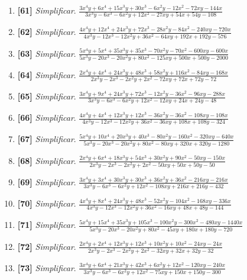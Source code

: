 \documentclass[11pt,a4paper]{article}
\newcommand{\ejercicio}[3]{\item \textbf{[#1]} \textit{#2}. $ #3 $}
\begin{document}
\begin{enumerate}
\ejercicio{61}{Simplificar}{\frac{3 x^{4} y + 6 x^{4} + 15 x^{3} y + 30 x^{3} - 6 x^{2} y - 12 x^{2} - 72 x y - 144 x}{3 x^{3} y - 6 x^{3} - 6 x^{2} y + 12 x^{2} - 27 x y + 54 x + 54 y - 108}}
\ejercicio{62}{Simplificar}{\frac{4 x^{4} y + 12 x^{4} + 24 x^{3} y + 72 x^{3} - 28 x^{2} y - 84 x^{2} - 240 x y - 720 x}{4 x^{3} y - 12 x^{3} - 12 x^{2} y + 36 x^{2} - 64 x y + 192 x + 192 y - 576}}
\ejercicio{63}{Simplificar}{\frac{5 x^{4} y + 5 x^{4} + 35 x^{3} y + 35 x^{3} - 70 x^{2} y - 70 x^{2} - 600 x y - 600 x}{5 x^{3} y - 20 x^{3} - 20 x^{2} y + 80 x^{2} - 125 x y + 500 x + 500 y - 2000}}
\ejercicio{64}{Simplificar}{\frac{2 x^{4} y + 4 x^{4} + 24 x^{3} y + 48 x^{3} + 58 x^{2} y + 116 x^{2} - 84 x y - 168 x}{2 x^{3} y - 2 x^{3} - 2 x^{2} y + 2 x^{2} - 72 x y + 72 x + 72 y - 72}}
\ejercicio{65}{Simplificar}{\frac{3 x^{4} y + 9 x^{4} + 24 x^{3} y + 72 x^{3} - 12 x^{2} y - 36 x^{2} - 96 x y - 288 x}{3 x^{3} y - 6 x^{3} - 6 x^{2} y + 12 x^{2} - 12 x y + 24 x + 24 y - 48}}
\ejercicio{66}{Simplificar}{\frac{4 x^{4} y + 4 x^{4} + 12 x^{3} y + 12 x^{3} - 36 x^{2} y - 36 x^{2} - 108 x y - 108 x}{4 x^{3} y - 12 x^{3} - 12 x^{2} y + 36 x^{2} - 36 x y + 108 x + 108 y - 324}}
\ejercicio{67}{Simplificar}{\frac{5 x^{4} y + 10 x^{4} + 20 x^{3} y + 40 x^{3} - 80 x^{2} y - 160 x^{2} - 320 x y - 640 x}{5 x^{3} y - 20 x^{3} - 20 x^{2} y + 80 x^{2} - 80 x y + 320 x + 320 y - 1280}}
\ejercicio{68}{Simplificar}{\frac{2 x^{4} y + 6 x^{4} + 18 x^{3} y + 54 x^{3} + 30 x^{2} y + 90 x^{2} - 50 x y - 150 x}{2 x^{3} y - 2 x^{3} - 2 x^{2} y + 2 x^{2} - 50 x y + 50 x + 50 y - 50}}
\ejercicio{69}{Simplificar}{\frac{3 x^{4} y + 3 x^{4} + 30 x^{3} y + 30 x^{3} + 36 x^{2} y + 36 x^{2} - 216 x y - 216 x}{3 x^{3} y - 6 x^{3} - 6 x^{2} y + 12 x^{2} - 108 x y + 216 x + 216 y - 432}}
\ejercicio{70}{Simplificar}{\frac{4 x^{4} y + 8 x^{4} + 24 x^{3} y + 48 x^{3} - 52 x^{2} y - 104 x^{2} - 168 x y - 336 x}{4 x^{3} y - 12 x^{3} - 12 x^{2} y + 36 x^{2} - 16 x y + 48 x + 48 y - 144}}
\ejercicio{71}{Simplificar}{\frac{5 x^{4} y + 15 x^{4} + 35 x^{3} y + 105 x^{3} - 100 x^{2} y - 300 x^{2} - 480 x y - 1440 x}{5 x^{3} y - 20 x^{3} - 20 x^{2} y + 80 x^{2} - 45 x y + 180 x + 180 y - 720}}
\ejercicio{72}{Simplificar}{\frac{2 x^{4} y + 2 x^{4} + 12 x^{3} y + 12 x^{3} + 10 x^{2} y + 10 x^{2} - 24 x y - 24 x}{2 x^{3} y - 2 x^{3} - 2 x^{2} y + 2 x^{2} - 32 x y + 32 x + 32 y - 32}}
\ejercicio{73}{Simplificar}{\frac{3 x^{4} y + 6 x^{4} + 21 x^{3} y + 42 x^{3} + 6 x^{2} y + 12 x^{2} - 120 x y - 240 x}{3 x^{3} y - 6 x^{3} - 6 x^{2} y + 12 x^{2} - 75 x y + 150 x + 150 y - 300}}

\end{enumerate}
\end{document}
